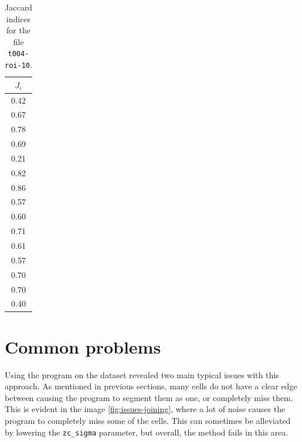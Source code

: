 \documentclass[
  digital,     %
  oneside,     %
  nosansbold,  %
  nocolorbold, %
  lof,         %
  lot,         %
]{fithesis4}
\begin{document}
\begin{table}
    \begin{tabular}{||c||}
        \toprule
        $J_i$\\
        \midrule
        0.42\\
        0.67\\
        0.78\\
        0.69\\
        0.21\\
        0.82\\
        0.86\\
        0.57\\
        0.60\\
        0.71\\
        0.61\\
        0.57\\
        0.70\\
        0.70\\
        0.40\\
        \bottomrule
    \end{tabular}
    \caption{Jaccard indices for the file \texttt{t004-roi-10}.}
    \label{tab:scores_roi10}
\end{table}

\section{Common problems}

Using the program on the dataset revealed two main typical issues with this
approach. As mentioned in previous sections, many cells do not have a clear edge
between causing the program to segment them as one, or completely miss them.
This is evident in the image \ref{fig:issues-joining}, where a lot of noise
causes the program to completely miss some of the cells. This can sometimes be
alleviated by lowering the \texttt{zc\_sigma} parameter, but overall, the method
fails in this area.
\end{document}
